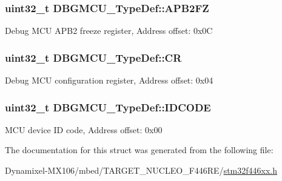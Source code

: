 \subsubsection[{\texorpdfstring{A\+P\+B2\+FZ}{APB2FZ}}]{ uint32\+\_\+t D\+B\+G\+M\+C\+U\+\_\+\+Type\+Def\+::\+A\+P\+B2\+FZ}\hypertarget{struct_d_b_g_m_c_u___type_def_a011f892d86367dbe786964b14bc515a6}{}\label{struct_d_b_g_m_c_u___type_def_a011f892d86367dbe786964b14bc515a6}
Debug M\+CU A\+P\+B2 freeze register, Address offset\+: 0x0C 
\subsubsection[{\texorpdfstring{CR}{CR}}]{ uint32\+\_\+t D\+B\+G\+M\+C\+U\+\_\+\+Type\+Def\+::\+CR}\hypertarget{struct_d_b_g_m_c_u___type_def_a15981828f2b915d38570cf6684e99a53}{}\label{struct_d_b_g_m_c_u___type_def_a15981828f2b915d38570cf6684e99a53}
Debug M\+CU configuration register, Address offset\+: 0x04 
\subsubsection[{\texorpdfstring{I\+D\+C\+O\+DE}{IDCODE}}]{ uint32\+\_\+t D\+B\+G\+M\+C\+U\+\_\+\+Type\+Def\+::\+I\+D\+C\+O\+DE}\hypertarget{struct_d_b_g_m_c_u___type_def_a0cc3561c124d06bb57dfa855e43ed99f}{}\label{struct_d_b_g_m_c_u___type_def_a0cc3561c124d06bb57dfa855e43ed99f}
M\+CU device ID code, Address offset\+: 0x00 

The documentation for this struct was generated from the following file\+:\begin{DoxyCompactItemize}
\item 
Dynamixel-\/\+M\+X106/mbed/\+T\+A\+R\+G\+E\+T\+\_\+\+N\+U\+C\+L\+E\+O\+\_\+\+F446\+R\+E/\hyperlink{stm32f446xx_8h}{stm32f446xx.\+h}\end{DoxyCompactItemize}
